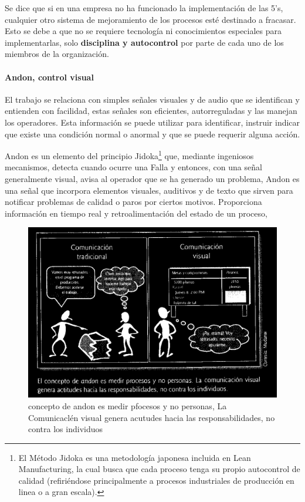 \documentclass[
]{article}
\begin{document}
Se dice que si en una empresa no ha funcionado la implementación de las
5's, cualquier otro sistema de mejoramiento de los procesos esté
destinado a fracasar. Esto se debe a que no se requiere tecnología ni
conocimientos especiales para implementarlas, solo \textbf{disciplina y
autocontrol} por parte de cada uno de los miembros de la organización.

\hypertarget{andon-control-visual}{%
\paragraph{Andon, control visual}\label{andon-control-visual}}

El trabajo se relaciona con simples señales visuales y de audio que se
identifican y entienden con facilidad, estas señales son eficientes,
autorreguladas y las manejan los operadores. Esta información se puede
utilizar para identificar, instruir indicar que existe una condición
normal o anormal y que se puede requerir alguna acción.

Andon es un elemento del principio Jidoka\footnote{El Método Jidoka es
  una metodología japonesa incluida en Lean Manufacturing, la cual busca
  que cada proceso tenga su propio autocontrol de calidad (refiriéndose
  principalmente a procesos industriales de producción en linea o a gran
  escala).} que, mediante ingeniosos mecanismos, detecta cuando ocurre
una Falla y entonces, con una señal generalmente visual, avisa al
operador que se ha generado un problema, Andon es una señal que
incorpora elementos visuales, auditivos y de texto que sirven para
notificar problemas de calidad o paros por ciertos motivos. Proporciona
información en tiempo real y retroalimentación del estado de un proceso,

\begin{figure}

{\centering \includegraphics[width=0.5\linewidth]{marco teorico/Screenshot from 2021-11-02 17-19-42} 

}

\caption{concepto de andon es medir pfocesos y no personas, La Comunicaclén visual genera acutudes hacia las responsabilidades, no contra los individuos}\label{fig:unnamed-chunk-3}
\end{figure}
\end{document}
